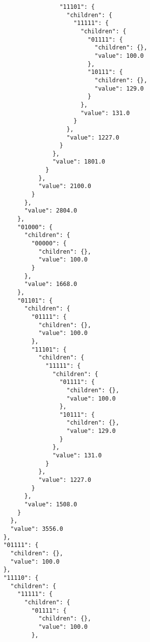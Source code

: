 \documentclass{article}
\begin{document}
\begin{listing}
\begin{verbatim}
                            "11101": {
                              "children": {
                                "11111": {
                                  "children": {
                                    "01111": {
                                      "children": {},
                                      "value": 100.0
                                    },
                                    "10111": {
                                      "children": {},
                                      "value": 129.0
                                    }
                                  },
                                  "value": 131.0
                                }
                              },
                              "value": 1227.0
                            }
                          },
                          "value": 1801.0
                        }
                      },
                      "value": 2100.0
                    }
                  },
                  "value": 2804.0
                },
                "01000": {
                  "children": {
                    "00000": {
                      "children": {},
                      "value": 100.0
                    }
                  },
                  "value": 1668.0
                },
                "01101": {
                  "children": {
                    "01111": {
                      "children": {},
                      "value": 100.0
                    },
                    "11101": {
                      "children": {
                        "11111": {
                          "children": {
                            "01111": {
                              "children": {},
                              "value": 100.0
                            },
                            "10111": {
                              "children": {},
                              "value": 129.0
                            }
                          },
                          "value": 131.0
                        }
                      },
                      "value": 1227.0
                    }
                  },
                  "value": 1508.0
                }
              },
              "value": 3556.0
            },
            "01111": {
              "children": {},
              "value": 100.0
            },
            "11110": {
              "children": {
                "11111": {
                  "children": {
                    "01111": {
                      "children": {},
                      "value": 100.0
                    },

\end{verbatim}
\end{listing}
\end{document}
